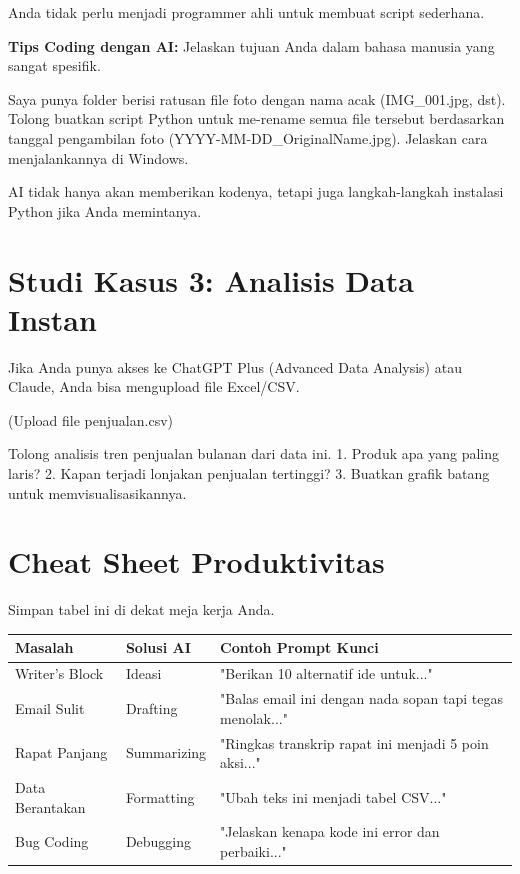 Anda tidak perlu menjadi programmer ahli untuk membuat script sederhana.

\begin{tipbox}
\textbf{Tips Coding dengan AI:}
Jelaskan tujuan Anda dalam bahasa manusia yang sangat spesifik.
\end{tipbox}

\begin{codeblock}[title=Prompt Python Script]
Saya punya folder berisi ratusan file foto dengan nama acak (IMG_001.jpg, dst).
Tolong buatkan script Python untuk me-rename semua file tersebut berdasarkan tanggal pengambilan foto (YYYY-MM-DD_OriginalName.jpg).
Jelaskan cara menjalankannya di Windows.
\end{codeblock}

AI tidak hanya akan memberikan kodenya, tetapi juga langkah-langkah instalasi Python jika Anda memintanya.

\section{Studi Kasus 3: Analisis Data Instan}

Jika Anda punya akses ke ChatGPT Plus (Advanced Data Analysis) atau Claude, Anda bisa mengupload file Excel/CSV.

\begin{promptbox}[title=Analisis Data]
(Upload file penjualan.csv)

Tolong analisis tren penjualan bulanan dari data ini.
1. Produk apa yang paling laris?
2. Kapan terjadi lonjakan penjualan tertinggi?
3. Buatkan grafik batang untuk memvisualisasikannya.
\end{promptbox}

\section{Cheat Sheet Produktivitas}

Simpan tabel ini di dekat meja kerja Anda.

\begin{center}
\begin{tabular}{|l|l|l|}
\hline
\textbf{Masalah} & \textbf{Solusi AI} & \textbf{Contoh Prompt Kunci} \\
\hline
Writer's Block & Ideasi & "Berikan 10 alternatif ide untuk..." \\
\hline
Email Sulit & Drafting & "Balas email ini dengan nada sopan tapi tegas menolak..." \\
\hline
Rapat Panjang & Summarizing & "Ringkas transkrip rapat ini menjadi 5 poin aksi..." \\
\hline
Data Berantakan & Formatting & "Ubah teks ini menjadi tabel CSV..." \\
\hline
Bug Coding & Debugging & "Jelaskan kenapa kode ini error dan perbaiki..." \\
\hline
\end{tabular}
\end{center}

